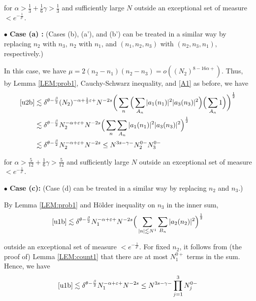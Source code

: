 \documentclass[11pt]{amsart}
\numberwithin{equation}{section} \numberwithin{theorem}{section}
\begin{document}
{
\noindent} for ${\alpha} > \frac{1}{3} + \frac{1}{6}{\gamma}> \frac{1}{3}$ and sufficiently large $N$ outside an exceptional set of measure $< e^{-\frac{1}{{\delta}^c}}$. \medskip

{
\noindent} $\bullet$ {\bf Case (a) :} (Cases (b), (a'), and (b') can be treated in a similar way by replacing $n_2$ with $n_3$, $n_2$ with $n_1$, and $(n_1, n_2, n_3)$ with $(n_2, n_3, n_1),$ respectively.)

In this case, we have $\mu = 2 (n_2 - n_1) (n_2 - n_3) = o( (N_2)^{8-16{\alpha}+})$.
Thus, by Lemma \ref{LEM:prob1}, Cauchy-Schwarz inequality, and \eqref{A1} as before, we have 
\begin{align*}
	\eqref{u2b} & 
	\lesssim {\delta}^{\theta-\frac{\beta}{2}} (N_2)^{-{\alpha} + \frac{1}{2}{\varepsilon} +} N^{-2s} 
	\bigg( \sum_n  \Big(\sum_{A_n}|a_1(n_1)|^2|a_3(n_3)|^2\Big)
	 \Big(\sum_{A_n}1\Big)\bigg)^\frac{1}{2} \notag \\
		& \lesssim {\delta}^{\theta-\frac{\beta}{2}} N_2^{-{\alpha}+{\varepsilon}+} N^{-2s}
	\Big( \sum_n  \sum_{A_n}|a_1(n_1)|^2|a_3(n_3)|^2
	 \Big)^\frac{1}{2} \notag \\
		& \lesssim {\delta}^{\theta-\frac{\beta}{2}} N_2^{-{\alpha}+{\varepsilon}+} N^{-2s}
		\leq N^{3s-{\gamma}-} N_2^{0-} N_3^{0-} 
\end{align*}

{
\noindent} 
for ${\alpha} > \frac{5}{12}+\frac{1}{6}{\gamma} > \frac{5}{12}$
and sufficiently large $N$
outside an exceptional set of measure $< e^{-\frac{1}{{\delta}^c}}$.

\medskip

{
\noindent} $\bullet$ {\bf Case (c):} (Case (d) can be treated in a similar way by replacing $n_2$ and $n_3$.)

 By Lemma \ref{LEM:prob1} and H\"older inequality on $n_3$ in the inner sum, 
\begin{align*}
	\eqref{u1b} \lesssim {\delta}^{\theta-\frac{\beta}{2}} N_1^{ -{\alpha} +{\varepsilon}+} N^{-2s} 
	 \Big( \sum_{|n| \lesssim N^1} \sum_{B_n} |a_2(n_2)|^2 \Big)^\frac{1}{2} 
\end{align*}

{
\noindent} outside an exceptional set of measure $< e^{-\frac{1}{{\delta}^c}}$. 
For fixed $n_2$, it follows from (the proof of) Lemma \ref{LEM:count1} that there are at most $N_1^{0+}$ terms in the sum. 
Hence, we have 
\begin{align*}
	\eqref{u1b} \lesssim {\delta}^{\theta-\frac{\beta}{2}} N_1^{ -{\alpha} +{\varepsilon}+} 
	N^{-2s}  \leq N^{3s-{\gamma} -} \prod_{j = 1}^3 N_j^{0-}
\end{align*}
\end{document}
